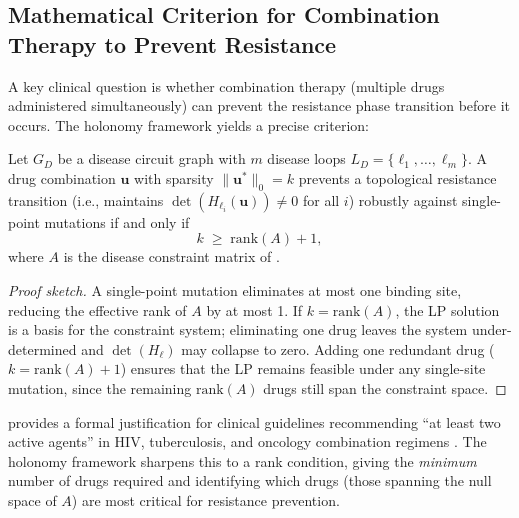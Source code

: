 \subsection{Mathematical Criterion for Combination Therapy to Prevent Resistance}

A key clinical question is whether combination therapy (multiple drugs
administered simultaneously) can prevent the resistance phase transition before
it occurs.  The holonomy framework yields a precise criterion:

\begin{theorem}
\label{thm:ch10-combination-resistance}
Let $G_D$ be a disease circuit graph with $m$ disease loops $L_D = \{\ell_1,
\ldots, \ell_m\}$.  A drug combination $\mathbf{u}$ with sparsity
$\|\mathbf{u}^*\|_0 = k$ prevents a topological resistance transition (i.e.,
maintains $\det(H_{\ell_i}(\mathbf{u})) \neq 0$ for all $i$) robustly against
single-point mutations if and only if
\begin{equation}
  \label{eq:ch10-combination-criterion}
  k \;\geq\; \mathrm{rank}(A) + 1,
\end{equation}
where $A$ is the disease constraint matrix of .
\end{theorem}

\begin{proof}[Proof sketch]
A single-point mutation eliminates at most one binding site, reducing the
effective rank of $A$ by at most 1.  If $k = \mathrm{rank}(A)$, the LP solution
is a basis for the constraint system; eliminating one drug leaves the system
under-determined and $\det(H_\ell)$ may collapse to zero.  Adding one redundant
drug ($k = \mathrm{rank}(A) + 1$) ensures that the LP remains feasible under
any single-site mutation, since the remaining $\mathrm{rank}(A)$ drugs still
span the constraint space.
\end{proof}

\begin{remark}
 provides a formal justification for
clinical guidelines recommending ``at least two active agents'' in HIV,
tuberculosis, and oncology combination regimens
\citep{Richman2006,Mitchison1998}.  The holonomy framework sharpens this to a
rank condition, giving the \emph{minimum} number of drugs required and
identifying which drugs (those spanning the null space of $A$) are most critical
for resistance prevention.
\end{remark}

